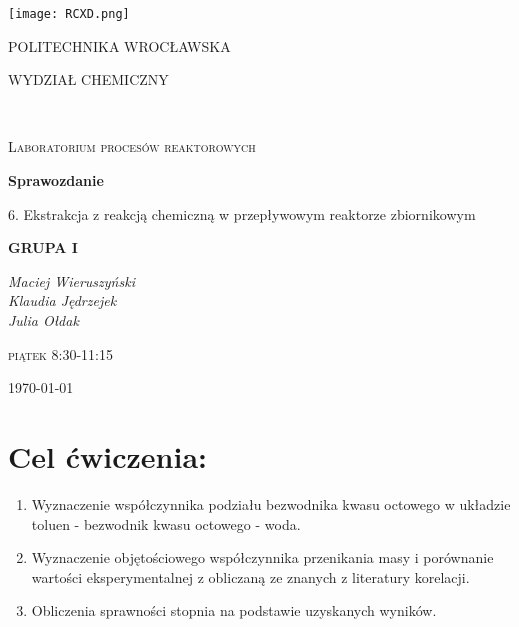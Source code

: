 \documentclass[11pt]{article}
\begin{document}
\begin{titlepage}
\centering
\texttt{[image: RCXD.png]}\par\vspace{0.5cm}
	{\scshape\LARGE POLITECHNIKA WROCŁAWSKA \par}
	{\scshape\LARGE WYDZIAŁ CHEMICZNY \par}
	\vspace{0.2 cm}
	\hrulefill
	\\
	\vspace{0.2 cm}
	{\scshape\Large Laboratorium procesów reaktorowych\par}
	\vspace{2.5cm}
	{\huge\bfseries Sprawozdanie\par}
	\vspace{0.5cm}
	{\huge 6. Ekstrakcja z reakcją chemiczną w przepływowym reaktorze zbiornikowym\par}
	\vspace{2.5cm}
	{\scshape\Large\bf GRUPA I\par}
	\vspace{0.25cm}
	{\Large\itshape Maciej Wieruszyński\\ Klaudia Jędrzejek\\Julia Ołdak
	\par}
	\vspace{1cm}
	{\scshape\Large piątek 8:30-11:15\par}
	\vfill	
	{\Large \today\par}
\end{titlepage}
\section{Cel ćwiczenia:}
\begin{enumerate}[label=(\alph*)]
\item Wyznaczenie współczynnika podziału bezwodnika kwasu octowego w układzie 
toluen - bezwodnik kwasu octowego - woda.
\item Wyznaczenie  objętościowego  współczynnika   przenikania   masy   i   porównanie 
wartości eksperymentalnej z obliczaną ze znanych z literatury korelacji.
\item Obliczenia sprawności stopnia na podstawie uzyskanych wyników.
\end{enumerate}
\end{document}
